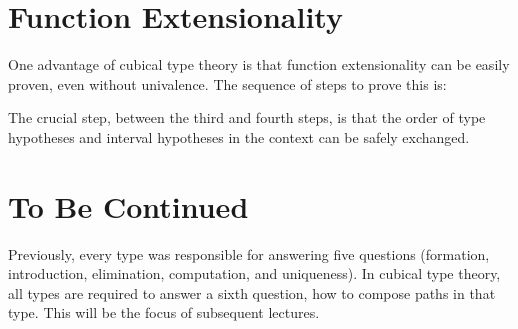 \documentclass[11pt]{article}
\begin{document}
\section{Function Extensionality}
One advantage of cubical type theory is that function extensionality can be easily proven, even without univalence. The sequence of steps to prove this is:

\begin{prooftree*}
\end{prooftree*}

The crucial step, between the third and fourth steps, is that the order of type hypotheses and interval hypotheses in the context can be safely exchanged.

\section{To Be Continued}
Previously, every type was responsible for answering five questions (formation, introduction, elimination, computation, and uniqueness). In cubical type theory, all types are required to answer a sixth question, how to compose paths in that type. This will be the focus of subsequent lectures.

\printbibliography
\end{document}

